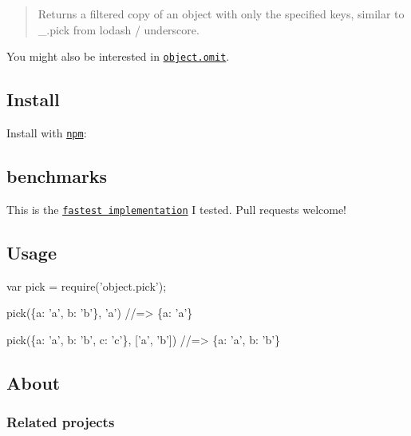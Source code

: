 \begin{quote}
Returns a filtered copy of an object with only the specified keys, similar to {\ttfamily \+\_\+.\+pick} from lodash / underscore. \end{quote}


You might also be interested in \href{https://github.com/jonschlinkert/object.omit}{\tt object.\+omit}.

\subsection*{Install}

Install with \href{https://www.npmjs.com/}{\tt npm}\+:




\subsection*{benchmarks}

This is the \href{http://jsperf.com/pick-props}{\tt fastest implementation} I tested. Pull requests welcome!

\subsection*{Usage}


\begin{DoxyCode}
var pick = require('object.pick');

pick(\{a: 'a', b: 'b'\}, 'a')
//=> \{a: 'a'\}

pick(\{a: 'a', b: 'b', c: 'c'\}, ['a', 'b'])
//=> \{a: 'a', b: 'b'\}
\end{DoxyCode}


\subsection*{About}

\subsubsection*{Related projects}



